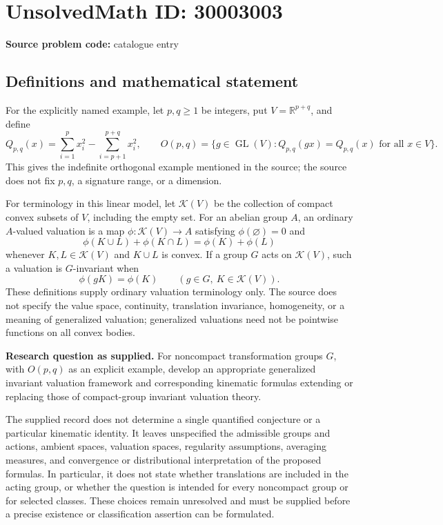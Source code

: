 \documentclass[11pt]{article}
\newcommand{\R}{\mathbb{R}}
\begin{document}
\section*{UnsolvedMath ID: 30003003}
\textbf{Source problem code:} catalogue entry
\subsection{Definitions and mathematical statement}
For the explicitly named example, let \(p,q\geq 1\) be integers, put \(V=\R^{p+q}\), and define
\[
Q_{p,q}(x)=\sum_{i=1}^{p}x_i^2-\sum_{i=p+1}^{p+q}x_i^2,
\qquad
O(p,q)=\{g\in\operatorname{GL}(V):Q_{p,q}(gx)=Q_{p,q}(x)\text{ for all }x\in V\}.
\]
This gives the indefinite orthogonal example mentioned in the source; the source does not fix \(p,q\), a signature range, or a dimension.

For terminology in this linear model, let \(\mathcal K(V)\) be the collection of compact convex subsets of \(V\), including the empty set. For an abelian group \(A\), an ordinary \(A\)-valued valuation is a map \(\phi:\mathcal K(V)\to A\) satisfying \(\phi(\varnothing)=0\) and
\[
\phi(K\cup L)+\phi(K\cap L)=\phi(K)+\phi(L)
\]
whenever \(K,L\in\mathcal K(V)\) and \(K\cup L\) is convex. If a group \(G\) acts on \(\mathcal K(V)\), such a valuation is \(G\)-invariant when
\[
\phi(gK)=\phi(K)\qquad(g\in G,\ K\in\mathcal K(V)).
\]
These definitions supply ordinary valuation terminology only. The source does not specify the value space, continuity, translation invariance, homogeneity, or a meaning of generalized valuation; generalized valuations need not be pointwise functions on all convex bodies.

\textbf{Research question as supplied.} For noncompact transformation groups \(G\), with \(O(p,q)\) as an explicit example, develop an appropriate generalized invariant valuation framework and corresponding kinematic formulas extending or replacing those of compact-group invariant valuation theory.

The supplied record does not determine a single quantified conjecture or a particular kinematic identity. It leaves unspecified the admissible groups and actions, ambient spaces, valuation spaces, regularity assumptions, averaging measures, and convergence or distributional interpretation of the proposed formulas. In particular, it does not state whether translations are included in the acting group, or whether the question is intended for every noncompact group or for selected classes. These choices remain unresolved and must be supplied before a precise existence or classification assertion can be formulated.
\end{document}
